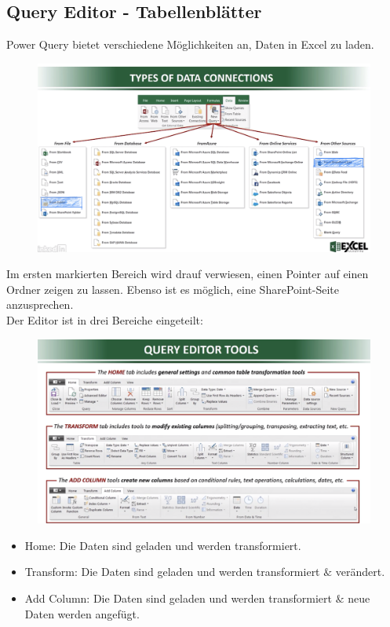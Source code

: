 \subsection{Query Editor - Tabellenblätter}
Power Query bietet verschiedene Möglichkeiten an, Daten in Excel zu laden. 
\begin{figure}[H]
	\centering
	\includegraphics[scale = 0.3]{attachment/chapter_1/screenshot020}
	\caption{}
	\label{fig:screenshot020}
\end{figure}
Im ersten markierten Bereich wird drauf verwiesen, einen Pointer auf einen Ordner zeigen zu lassen. Ebenso ist es möglich, eine SharePoint-Seite anzusprechen.\\ 

Der Editor ist in drei Bereiche eingeteilt: \begin{figure}[H]
	\centering
	\includegraphics[scale = 0.3]{attachment/chapter_1/screenshot021}
	\caption{}
	\label{fig:screenshot021}
\end{figure}
\begin{itemize}
\item Home: Die Daten sind geladen und werden transformiert. 
\item Transform: Die Daten sind geladen und werden transformiert $\&$ verändert.
\item Add Column: Die Daten sind geladen und werden transformiert $\&$ neue Daten werden angefügt.
\end{itemize}
